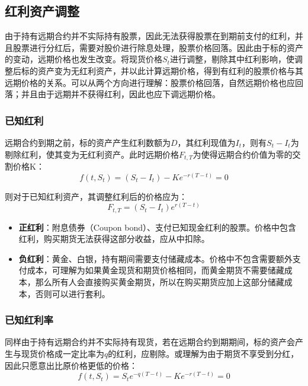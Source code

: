 \documentclass[11pt]{article}
\begin{document}
\subsection{红利资产调整}

由于持有远期合约并不实际持有股票，因此无法获得股票在到期前支付的红利，并且股票进行分红后，需要对股价进行除息处理，股票价格回落。因此由于标的资产的变动，远期价格也发生改变。将现货价格$S_t$进行调整，剔除其中红利影响，使调整后标的资产变为无红利资产，并以此计算远期价格，得到有红利的股票价格与其远期价格的关系。可以从两个方向进行理解：股票价格回落，自然远期价格也应回落；并且由于远期并不获得红利，因此也应下调远期价格。

\subsubsection{已知红利}
远期合约到期之前，标的资产产生红利数额为$D$，其红利现值为$I_t$，则有$S_t-I_t$为剔除红利，使其变为无红利资产。此时远期价格$F_{t,T}$为使得远期合约价值为零的交割价格K：
\begin{equation*}
    f(t,S_t) = \left( S_t - I_t \right) - K e^{-r(T-t)} = 0
\end{equation*}

则对于已知红利资产，其调整红利后的价格应为：
\begin{equation*}
    F_{t,T} = \left(S_t - I_t \right)e^{r(T-t)}
\end{equation*}

\begin{itemize}
    \item \textbf{正红利}：附息债券（Coupon bond）、支付已知现金红利的股票。价格中包含红利，购买期货无法获得这部分收益，应从中扣除。
    \item \textbf{负红利}：黄金、白银，持有期间需要支付储藏成本。价格中不包含需要额外支付成本，可理解为如果黄金现货和期货价格相同，而黄金期货不需要储藏成本，那么所有人会直接购买黄金期货，所以在购买期货应加上这部分储藏成本，否则可以进行套利。
\end{itemize}

\subsubsection{已知红利率}

同样由于持有远期合约并不实际持有现货，若在远期合约到期期间，标的资产会产生与现货价格成一定比率为$q$的红利，应剔除。或理解为由于期货不享受到分红，因此只愿意出比原价格更低的价格：
\begin{equation*}
    f(t,S_t) = S_t e^{-q(T-t)} - K e^{-r(T-t)} = 0
\end{equation*}
\end{document}
